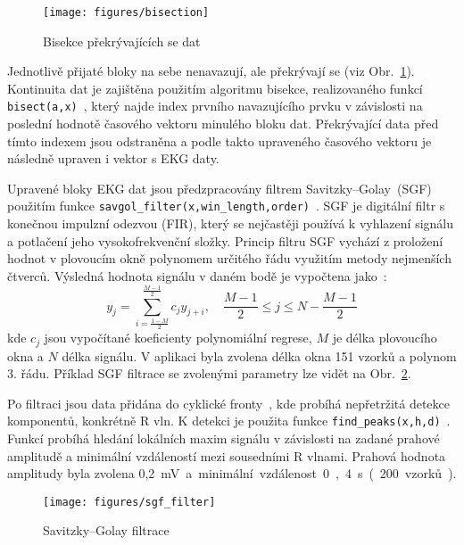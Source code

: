 \begin{figure}[h]
    \begin{center}
        \texttt{[image: figures/bisection]}
        \caption{Bisekce překrývajících se dat}
        \label{fig:bisection}
    \end{center}
\end{figure}

Jednotlivě přijaté bloky na sebe nenavazují, ale překrývají se (viz Obr.~\ref{fig:bisection}). 
Kontinuita dat je zajištěna použitím algoritmu bisekce, realizovaného funkcí
\texttt{bisect(a,x)}~\cite{bisectRight}, který najde index prvního navazujícího
prvku v závislosti na poslední hodnotě časového vektoru minulého bloku dat.
Překrývající data před tímto indexem jsou odstraněna a podle takto upraveného
časového vektoru je následně upraven i vektor s EKG daty.

Upravené bloky EKG dat jsou předzpracovány filtrem
Savitzky–Golay~(SGF)~\cite{Schafer2011} použitím funkce
\texttt{savgol{\_}filter(x,win{\_}length,order)}~\cite{scipySavgol}. 
SGF je digitální filtr s konečnou impulzní odezvou (FIR), který se
nejčastěji používá k vyhlazení signálu a potlačení jeho vysokofrekvenční složky.
Princip filtru SGF vychází z proložení hodnot v plovoucím okně polynomem
určitého řádu využitím metody nejmenších čtverců. Výsledná hodnota signálu v
daném bodě je vypočtena jako~\cite{wikiSGF}:
\begin{equation}
    y_j = \sum_{i=\frac{1-M}{2}}^{\frac{M-1}{2}} c_j y_{j+i}, \quad \frac{M-1}{2} \leq j \leq N - \frac{M-1}{2}
\end{equation}
kde $c_j$ jsou vypočítané koeficienty polynomiální regrese, $M$ je délka
plovoucího okna a $N$ délka signálu. V aplikaci byla zvolena délka okna 151
vzorků a polynom 3. řádu. Příklad SGF filtrace se zvolenými parametry lze vidět
na Obr.~\ref{fig:sgf_filter}.

Po filtraci jsou data přidána do cyklické fronty~\cite{circlebuffer}, kde
probíhá nepřetržitá detekce komponentů, konkrétně R vln. K detekci je použita
funkce \texttt{find{\_}peaks(x,h,d)}~\cite{scipyFindpeaks}. Funkcí probíhá
hledání lokálních maxim signálu v závislosti na zadané prahové amplitudě a
minimální vzdáleností mezi sousedními R vlnami. Prahová hodnota amplitudy byla
zvolena 0,2~\si\mV~a minimální vzdálenost 0,4~\si\s~(200 vzorků).

\begin{figure}[h]
    \begin{center}
        \texttt{[image: figures/sgf\_filter]}
        \caption{Savitzky–Golay filtrace}
        \label{fig:sgf_filter}
    \end{center}
\end{figure}

